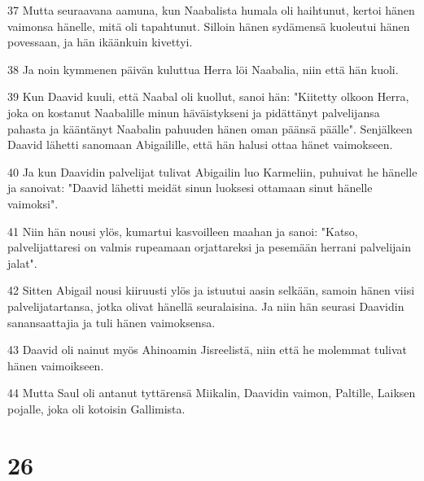 \par 37 Mutta seuraavana aamuna, kun Naabalista humala oli haihtunut, kertoi hänen vaimonsa hänelle, mitä oli tapahtunut. Silloin hänen sydämensä kuoleutui hänen povessaan, ja hän ikäänkuin kivettyi.
\par 38 Ja noin kymmenen päivän kuluttua Herra löi Naabalia, niin että hän kuoli.
\par 39 Kun Daavid kuuli, että Naabal oli kuollut, sanoi hän: "Kiitetty olkoon Herra, joka on kostanut Naabalille minun häväistykseni ja pidättänyt palvelijansa pahasta ja kääntänyt Naabalin pahuuden hänen oman päänsä päälle". Senjälkeen Daavid lähetti sanomaan Abigailille, että hän halusi ottaa hänet vaimokseen.
\par 40 Ja kun Daavidin palvelijat tulivat Abigailin luo Karmeliin, puhuivat he hänelle ja sanoivat: "Daavid lähetti meidät sinun luoksesi ottamaan sinut hänelle vaimoksi".
\par 41 Niin hän nousi ylös, kumartui kasvoilleen maahan ja sanoi: "Katso, palvelijattaresi on valmis rupeamaan orjattareksi ja pesemään herrani palvelijain jalat".
\par 42 Sitten Abigail nousi kiiruusti ylös ja istuutui aasin selkään, samoin hänen viisi palvelijatartansa, jotka olivat hänellä seuralaisina. Ja niin hän seurasi Daavidin sanansaattajia ja tuli hänen vaimoksensa.
\par 43 Daavid oli nainut myös Ahinoamin Jisreelistä, niin että he molemmat tulivat hänen vaimoikseen.
\par 44 Mutta Saul oli antanut tyttärensä Miikalin, Daavidin vaimon, Paltille, Laiksen pojalle, joka oli kotoisin Gallimista.

\chapter{26}

